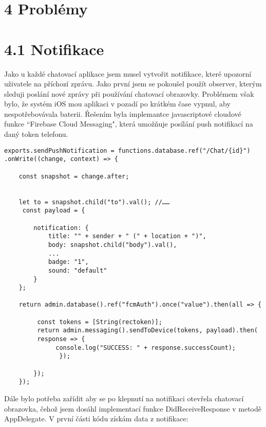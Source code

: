 \documentclass{article}
\begin{document}
\section*{4 Problémy}
\vspace{10 mm}

\section*{4.1 Notifikace}
\vspace{10 mm}
Jako u každé chatovací aplikace jsem musel vytvořit notifikace, které upozorní uživatele na příchozí zprávu. Jako první jsem se pokoušel použít observer, kterým sleduji poslání nové zprávy při používání chatovací obrazovky. Problémem však bylo, že systém iOS mou aplikaci v pozadí po krátkém čase vypnul, aby nespotřebovávala baterii. Řešením byla implemantce javascriptové cloudové funkce “Firebase Cloud Messaging", která umožňuje posílání push notifikací na daný token telefonu. 
\vspace{10 mm}

\begin{verbatim}
exports.sendPushNotification = functions.database.ref("/Chat/{id}")  
.onWrite((change, context) => {
	
    const snapshot = change.after;


    let to = snapshot.child("to").val(); //……
	 const payload = {
    
		notification: {
			title: "" + sender + " (" + location + ")",
			body: snapshot.child("body").val(),
			...
          	badge: "1",
			sound: "default"
		}
	};
    
	return admin.database().ref("fcmAuth").once("value").then(all => {
        
         const tokens = [String(rectoken)];
  	     return admin.messaging().sendToDevice(tokens, payload).then(
  	     response => {
    	      console.log("SUCCESS: " + response.successCount);
      		   });
        
		}); 
	}); 

\end{verbatim}









\vspace{10 mm}
Dále bylo potřeba zařídit aby se po klepnutí na notifikaci otevřela chatovací obrazovka, čehož jsem dosáhl implementací funkce DidReceiveResponse v metodě AppDelegate. V první části kódu získám data z notifikace:
\end{document}
